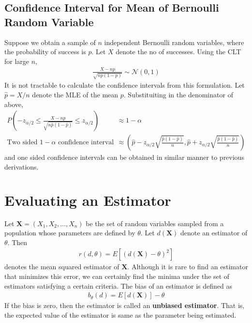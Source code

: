 \documentclass[../probability-notes.tex]{subfiles}
\begin{document}
    \subsection{Confidence Interval for Mean of Bernoulli Random Variable}
    Suppose we obtain a sample of $n$ independent Bernoulli random variables, where the probability of success is $p$. Let $X$ denote the no of successes. Using the CLT for large $n$,
    \begin{align*}
        \frac{X - np}{\sqrt{np(1-p)}} \sim \mathcal{N}(0, 1)
    \end{align*}
    It is not tractable to calculate the confidence intervals from this formulation. Let $\hat{p} = X/n$ denote the MLE of the mean $p$. Substituiting in the denominator of above,
    \begin{align*}
        P(-z_{\alpha/2} \leq \frac{X - np}{\sqrt{n\hat{p}(1-\hat{p})}} \leq z_{\alpha/2}) &\approx 1-\alpha\\
        \text{Two sided $1-\alpha$ confidence interval} &\approx (\hat{p} - z_{\alpha/2}\sqrt{\frac{\hat{p}(1-\hat{p})}{n}}, \hat{p} + z_{\alpha/2}\sqrt{\frac{\hat{p}(1-\hat{p})}{n}})
    \end{align*}
    and one sided confidence intervals can be obtained in similar manner to previous derivations.



    \section{Evaluating an Estimator}
    Let $\boldsymbol{X} = (X_{1}, X_{2}, \ldots, X_{n})$ be the set of random variables sampled from a population whose parameters are defined by $\theta$. Let $d(\boldsymbol{X})$ denote an estimator of $\theta$. Then
    \begin{align*}
        r(d, \theta) = E[(d(\boldsymbol{X}) - \theta)^{2}]
    \end{align*}
    denotes the mean squared estimator of $\boldsymbol{X}$. Although it is rare to find an estimator that minimizes this error, we can certainly find the minima under the set of estimators satisfying a certain criteria.\newline
    The bias of an estimator is defined as
    \begin{align*}
        b_{\theta}(d) = E[d(\boldsymbol{X})] - \theta
    \end{align*}
    If the bias is zero, then the estimator is called an \textbf{unbiased estimator}. That is, the expected value of the estimator is same as the parameter being estimated.\newline
\end{document}
